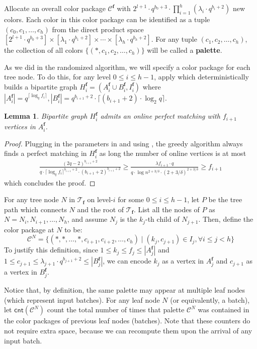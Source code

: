 \documentclass[11pt,a4paper]{article}
\newtheorem{lemma}{Lemma}[section]
\newcommand{\ceil}[1]{\lceil #1 \rceil}
\newcommand{\tree}{\mathcal{T}}
\newcommand{\freq}{\mathbf{f}}
\newcommand{\clr}{\mathcal{C}}
\newcommand{\cnt}{\mathsf{cnt}}
\begin{document}
Allocate an overall color package $\clr^\freq$ with $2^{l+1}\cdot q^{b_0+3}\cdot\prod_{i=1}^h(\lambda_i\cdot q^{b_i+2})$ new colors. Each color in this color package can be identified as a tuple $(c_0, c_1, \ldots, c_h)$ from the direct product space $[2^{l+1}\cdot q^{b_0+3}]\times [\lambda_1\cdot q^{b_1+2}] \times\cdots\times [\lambda_{h}\cdot q^{b_{h}+2}]$. For any tuple $(c_1, c_2, \ldots, c_h)$, the collection of all colors $\{(*, c_1, c_2, \ldots, c_h)\}$ will be called a \textbf{palette}. 

As we did in the randomized algorithm, we will specify a color package for each tree node. To do this, for any level $0\leq i\leq h-1$, apply  which deterministically builds a bipartite graph $H_i^\freq = (A_i^\freq\cup B_i^\freq, I_i^\freq)$ where $|A_i^\freq| = q^{\ceil{\log_q f_i}}, |B_i^\freq| = q^{b_{i+1}+2}\cdot \ceil{(b_{i+1}+2)\cdot \log_2q}$.

\begin{lemma}\label{verify-perfect}
    Bipartite graph $H_i^\freq$ admits an online perfect matching with $f_{i+1}$ vertices in $A_i^\freq$.
\end{lemma}
\begin{proof}
    Plugging in the parameters in  and using , the greedy algorithm always finds a perfect matching in $H_i^\freq$ as long the number of online vertices is at most 
    $$\begin{aligned}
        \frac{(2q-2)^{b_{i+1}+2}}{q\cdot \ceil{\log_q f_i}^{b_{i+1}+2}\cdot (b_{i+1}+2)^{b_{i+1}+2}}\geq \frac{\lambda f_{i+1}\cdot q}{q\cdot \log n^{2+3/\delta}\cdot (2+3/\delta)^{2+3/\delta}} \geq f_{i+1}
    \end{aligned}$$
    which concludes the proof.
\end{proof}

For any tree node $N$ in $\tree_\freq$ on level-$i$ for some $0\leq i\leq h-1$, let $P$ be the tree path which connects $N$ and the root of $\tree_{\freq}$. List all the nodes of $P$ as $N = N_i, N_{i+1}, \ldots, N_h$, and assume $N_j$ is the $k_j$-th child of $N_{j+1}$. Then, define the color package at $N$ to be:
$$\clr^N = \{(*, *, \ldots, *, c_{i+1}, c_{i+2}, \ldots, c_h)\mid (k_j, c_{j+1})\in I_j, \forall i\leq j < h\}$$
To justify this definition, since $1\leq k_j\leq f_j\leq |A_j^\freq|$ and $1\leq c_{j+1}\leq \lambda_{j+1}\cdot q^{b_{j+1}+2}\leq |B_j^\freq|$, we can encode $k_j$ as a vertex in $A_j^\freq$ and $c_{j+1}$ as a vertex in $B_j^\freq$.

Notice that, by definition, the same palette may appear at multiple leaf nodes (which represent input batches). For any leaf node $N$ (or equivalently, a batch), let $\cnt(\clr^N)$ count the total number of times that palette $\clr^N$ was contained in the color packages of previous leaf nodes (batches). Note that these counters do not require extra space, because we can recompute them upon the arrival of any input batch.
\end{document}
